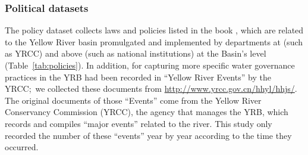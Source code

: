 \subsubsection*{Political datasets}
The policy dataset collects laws and policies listed in the book \cite{yellowriverconservancycommission2013}, which are related to the Yellow River basin promulgated and implemented by departments at (such as YRCC) and above (such as national institutions) at the Basin's level (Table~\ref{tab:policies}).
In addition, for capturing more specific water governance practices in the YRB had been recorded in ``Yellow River Events'' by the YRCC;\ we collected these documents from \url{http://www.yrcc.gov.cn/hhyl/hhjs/}.
The original documents of those ``Events'' come from the Yellow River Conservancy Commission (YRCC), the agency that manages the YRB, which records and compiles ``major events'' related to the river. This study only recorded the number of these ``events'' year by year according to the time they occurred.

